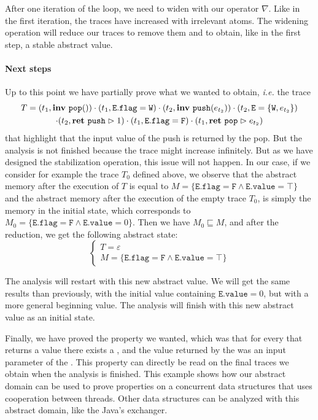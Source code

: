 After one iteration of the loop, we need to widen with our operator $\nabla$. Like in the first iteration, the traces have increased with irrelevant atoms. The widening operation will reduce our traces to remove them and to obtain, like in the first step, a stable abstract value. 


\paragraph{Next steps} Up to this point we have partially prove what we wanted to obtain, \emph{i.e.} the trace
\begin{multline*}
T = (t_1, \mathbf{inv}\ \mathtt{pop}())\cdot (t_1, \mathtt{E.flag} = \mathtt{W}) \cdot (t_2, \mathbf{inv}\ \mathtt{push}(e_{t_2})) \cdot (t_2, \mathtt{E} = \{\mathtt{W}, e_{t_2}\}) \\
\cdot (t_2, \mathbf{ret}\ \mathtt{push} \vartriangleright 1) \cdot (t_1, \mathtt{E.flag} = \mathtt{F}) \cdot (t_1, \mathbf{ret}\ \mathtt{pop} \vartriangleright e_{t_2})
\end{multline*}
that highlight that the input value of the push is returned by the pop. But the analysis is not finished because the trace might increase infinitely. 
But as we have designed the stabilization operation, this issue will not happen. In our case, if we consider for example the trace $T_0$ defined above, we observe that the abstract memory after the execution of $T$ is equal to $M = \{\mathtt{E.flag} = \mathtt{F} \wedge \mathtt{E.value} = \top\}$ and the abstract memory after the execution of the empty trace $T_0$, is simply the memory in the initial state, which corresponds to $M_0 = \{\mathtt{E.flag} = \mathtt{F} \wedge \mathtt{E.value} = 0\}$. Then we have $M_0 \sqsubseteq M$, and after the reduction, we get the following abstract state:
\[
\begin{cases}
	T = \varepsilon\\
	M = \{\mathtt{E.flag} = \mathtt{F} \wedge \mathtt{E.value} = \top\}
\end{cases}
\]

The analysis will restart with this new abstract value. We will get the same results than previously, with the initial value containing $\mathtt{E.value} = 0$, but with a more general beginning value. The analysis will finish with this new abstract value as an initial state.

\bigskip

Finally, we have proved the property we wanted, which was that for every  that returns a value there exists a , and the value returned by the  was an input parameter of the . This property can directly be read on the final traces we obtain when the analysis is finished. This example shows how our abstract domain can be used to prove properties on a concurrent data structures that uses cooperation between threads. Other data structures can be analyzed with this abstract domain, like the Java's exchanger. 

